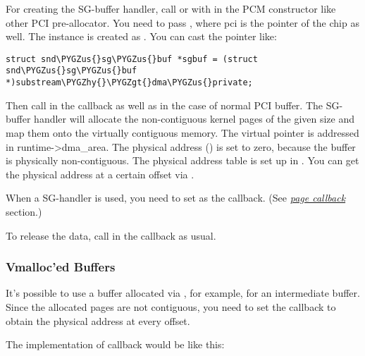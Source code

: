 \documentclass[a4paper,8pt,english]{sphinxmanual}
\def\PYGZus{\char`\_}
\def\PYGZgt{\char`\>}
\def\PYGZhy{\char`\-}
\begin{document}
For creating the SG-buffer handler, call
 or
 with
 in the PCM constructor like other PCI
pre-allocator. You need to pass , where pci is
the  pointer of the chip as
well. The  instance is created as
. You can cast the pointer like:

\begin{Verbatim}[commandchars=\\\{\}]
struct snd\PYGZus{}sg\PYGZus{}buf *sgbuf = (struct snd\PYGZus{}sg\PYGZus{}buf *)substream\PYGZhy{}\PYGZgt{}dma\PYGZus{}private;
\end{Verbatim}

Then call  in the 
callback as well as in the case of normal PCI buffer. The SG-buffer
handler will allocate the non-contiguous kernel pages of the given size
and map them onto the virtually contiguous memory. The virtual pointer
is addressed in runtime-\textgreater{}dma\_area. The physical address
() is set to zero, because the buffer is
physically non-contiguous. The physical address table is set up in
. You can get the physical address at a certain offset
via .

When a SG-handler is used, you need to set
 as the  callback. (See
{\hyperref[sound/kernel\string-api/writing\string-an\string-alsa\string-driver:page\string-callback]{\emph{page callback}}} section.)

To release the data, call  in
the  callback as usual.


\subsubsection{Vmalloc'ed Buffers}
\label{sound/kernel-api/writing-an-alsa-driver:vmalloc-ed-buffers}
It's possible to use a buffer allocated via , for
example, for an intermediate buffer. Since the allocated pages are not
contiguous, you need to set the  callback to obtain the physical
address at every offset.

The implementation of  callback would be like this:
\end{document}
